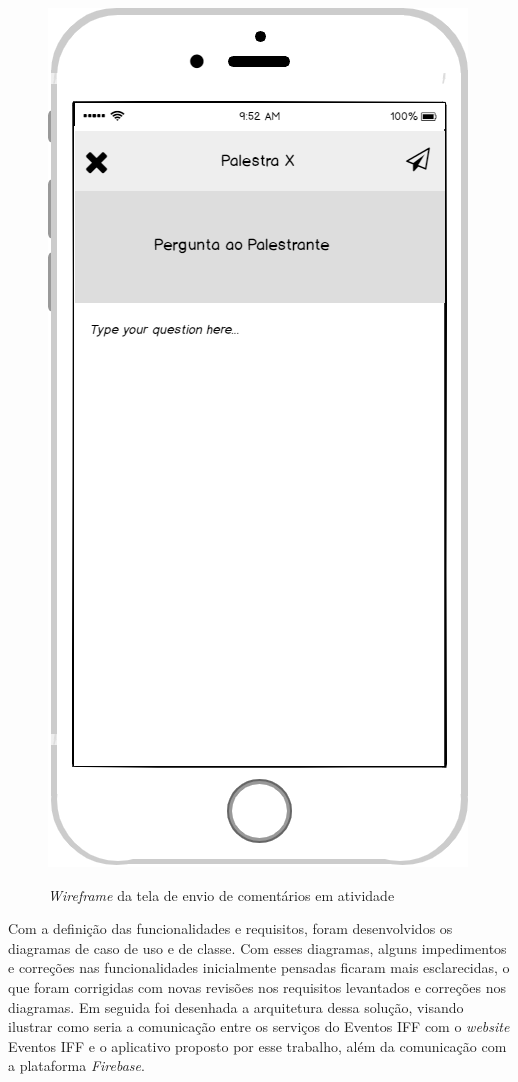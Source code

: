 \begin{figure}[H]
    \centering
    \caption{\textit{Wireframe} da tela de envio de comentários em atividade}
    \includegraphics[scale=0.4]{figuras/wireframe2.png}
    \label{fig:wireframe2}
\end{figure}

Com a definição das funcionalidades e requisitos, foram desenvolvidos os diagramas de caso de uso e de classe. Com esses diagramas, alguns impedimentos e correções nas funcionalidades inicialmente pensadas ficaram mais esclarecidas, o que foram corrigidas com novas revisões nos requisitos levantados e correções nos diagramas. Em seguida foi desenhada a arquitetura dessa solução, visando ilustrar como seria a comunicação entre os serviços do Eventos IFF com o \textit{website} Eventos IFF e o aplicativo proposto por esse trabalho, além da comunicação com a plataforma \textit{Firebase}.

